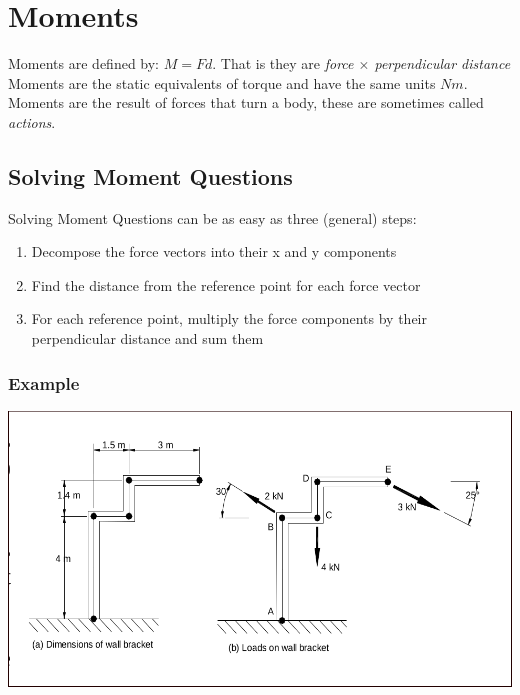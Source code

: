 \documentclass[a4paper, 12pt]{article}
\begin{document}
\section{Moments}
Moments are defined by: $M=Fd$.
That is they are \textit{force $\times$ perpendicular distance}
Moments are the static equivalents of torque and have the same units $Nm$.
Moments are the result of forces that turn a body, these are sometimes called \textit{actions}.
\subsection{Solving Moment Questions}
Solving Moment Questions can be as easy as three (general) steps:
\begin{enumerate}
    \item Decompose the force vectors into their x and y components 
    \item Find the distance from the reference point for each force vector
    \item For each reference point, multiply the force components by their perpendicular distance and sum them 
\end{enumerate}
\newpage
\subsubsection{Example}
\includegraphics[scale=0.2]{topic-3}
\end{document}
